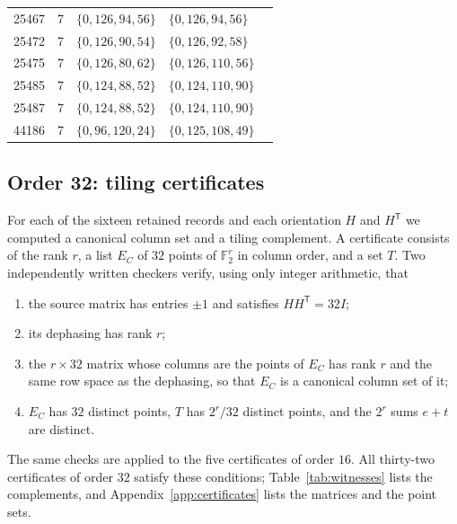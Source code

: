 \documentclass[11pt]{amsart}
\theoremstyle{definition}
\theoremstyle{remark}
\numberwithin{equation}{section}
\numberwithin{table}{section}
\newcommand{\F}{\mathbb{F}}
\newcommand{\T}{\mathsf{T}}
\begin{document}
\begin{table}[ht]
\begin{tabular}{rclll}
25467 & 7 & $\{0,\allowbreak 126,\allowbreak 94,\allowbreak 56\}$ & $\{0,\allowbreak 126,\allowbreak 94,\allowbreak 56\}$ \\
25472 & 7 & $\{0,\allowbreak 126,\allowbreak 90,\allowbreak 54\}$ & $\{0,\allowbreak 126,\allowbreak 92,\allowbreak 58\}$ \\
25475 & 7 & $\{0,\allowbreak 126,\allowbreak 80,\allowbreak 62\}$ & $\{0,\allowbreak 126,\allowbreak 110,\allowbreak 56\}$ \\
25485 & 7 & $\{0,\allowbreak 124,\allowbreak 88,\allowbreak 52\}$ & $\{0,\allowbreak 124,\allowbreak 110,\allowbreak 90\}$ \\
25487 & 7 & $\{0,\allowbreak 124,\allowbreak 88,\allowbreak 52\}$ & $\{0,\allowbreak 124,\allowbreak 110,\allowbreak 90\}$ \\
44186 & 7 & $\{0,\allowbreak 96,\allowbreak 120,\allowbreak 24\}$ & $\{0,\allowbreak 125,\allowbreak 108,\allowbreak 49\}$ \\
\bottomrule
\end{tabular}
\end{table}

\subsection{Order 32: tiling certificates}
For each of the sixteen retained records and each orientation $H$ and $H^{\T}$ we computed a canonical column set and a tiling complement. A certificate consists of the rank $r$, a list $E_C$ of $32$ points of $\F_2^r$ in column order, and a set $T$. Two independently written checkers verify, using only integer arithmetic, that
\begin{enumerate}
\item the source matrix has entries $\pm1$ and satisfies $HH^{\T}=32I$;
\item its dephasing has rank $r$;
\item the $r\times32$ matrix whose columns are the points of $E_C$ has rank $r$ and the same row space as the dephasing, so that $E_C$ is a canonical column set of it;
\item $E_C$ has $32$ distinct points, $T$ has $2^r/32$ distinct points, and the $2^r$ sums $e+t$ are distinct.
\end{enumerate}
The same checks are applied to the five certificates of order $16$. All thirty-two certificates of order $32$ satisfy these conditions; Table~\ref{tab:witnesses} lists the complements, and Appendix~\ref{app:certificates} lists the matrices and the point sets.
\end{document}
